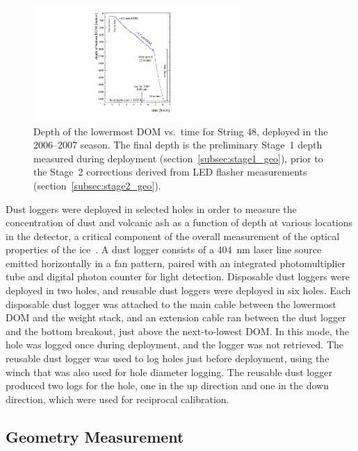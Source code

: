 \begin{figure}[!ht]
 \centering
 \includegraphics[width=0.70\textwidth]{graphics/drill/String48_deploy.pdf}
\caption{Depth of the lowermost DOM vs.~time for String 48, deployed in the
  2006--2007 season. The final depth is the preliminary Stage~1 depth
  measured during deployment (section~\ref{subsec:stage1_geo}),
prior to the Stage~2 corrections derived from LED flasher
measurements (section~\ref{subsec:stage2_geo}).}
\label{fig:deploytime}
\end{figure}

Dust loggers were deployed in selected holes in order to measure the
concentration of dust and volcanic ash as a function of depth at various
locations in the detector, a critical component of the overall measurement
of the optical properties of the
ice~\cite{Aartsen:2013rt,citeulike:2998650}. A dust logger consists of a 404~nm laser line source emitted horizontally in a
fan pattern, paired with an integrated
photomultiplier tube and digital photon counter for light
detection. Disposable dust loggers were deployed in two holes, and reusable dust loggers were
deployed in six holes. Each disposable dust
logger was attached to the main cable between the lowermost DOM and the
weight stack, and an extension cable ran between the dust logger and the
bottom breakout, just above the next-to-lowest DOM. In this mode, the hole
was logged once during deployment, and the logger was not
retrieved. The reusable dust logger was used to
log holes just before deployment, using the winch that was also used for
hole diameter logging. The reusable dust logger produced two logs for the
hole, one in the up direction and one in the down direction, which were used for
reciprocal calibration.


\subsection{Geometry Measurement}

